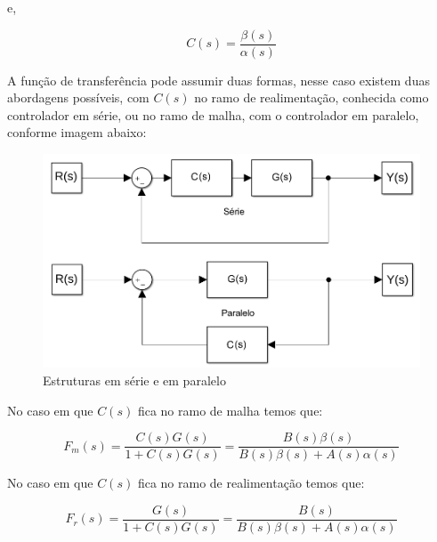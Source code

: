\documentclass[conference,harvard,brazil,english]{sbatex}
\begin{document}
            e,
            
            \begin{equation}
                \label{equ:Cs}
                C(s) = \frac{\beta(s)}{\alpha(s)}
            \end{equation}
            
            A função de transferência pode assumir duas formas, nesse caso existem duas abordagens possíveis, com $C(s)$ no ramo de realimentação, conhecida como controlador em série, ou no ramo de malha, com o controlador em paralelo, conforme imagem abaixo:
            
            \begin{figure}[H]
                \centering
                \includegraphics[scale=0.3]{imagens/serieparalelo.png}
                \caption{Estruturas em série e em paralelo}
                \label{fig:serieparalelo}
            \end{figure}
            
            No caso em que $C(s)$ fica no ramo de malha temos que:
            
            \begin{equation}
                \label{equ:c_ramodemalha}
                F_m(s) = \frac{ C(s) G(s) } { 1 + C(s) G(s) } = \frac { B(s) \beta(s) } { B(s) \beta(s) + A(s) \alpha(s) }
            \end{equation}
            
            No caso em que $C(s)$ fica no ramo de realimentação temos que:
            
            \begin{equation}
                \label{equ:c_ramorealimentado}
                F_r(s) = \frac{ G(s) } { 1 + C(s) G(s) } = \frac { B(s) } { B(s) \beta(s) + A(s) \alpha(s) }
            \end{equation}
            
\end{document}
